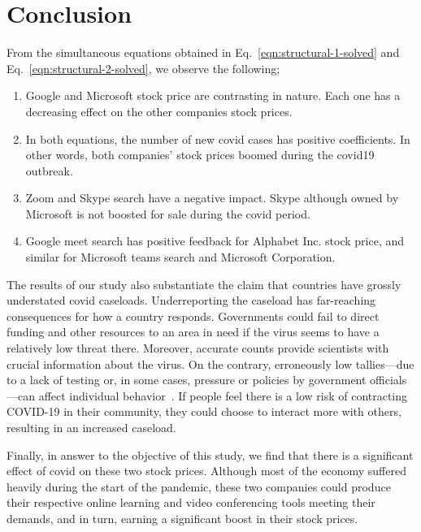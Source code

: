 \documentclass[11pt, a4paper]{article}
\begin{document}
\section{Conclusion}

From the simultaneous equations obtained in Eq.~\eqref{eqn:structural-1-solved} and Eq.~\eqref{eqn:structural-2-solved}, we observe the following;


\begin{enumerate}
    \item Google and Microsoft stock price are contrasting in nature. Each one has a decreasing effect on the other companies stock prices.
    \item In both equations, the number of new covid cases has positive coefficients. In other words, both companies' stock prices boomed during the covid19 outbreak. 
    \item Zoom and Skype search have a negative impact. Skype although owned by Microsoft is not boosted for sale during the covid period. 
    \item Google meet search has positive feedback for Alphabet Inc. stock price, and similar for Microsoft teams search and Microsoft Corporation.
\end{enumerate}

The results of our study also substantiate the claim that countries have grossly understated covid caseloads. Underreporting the caseload has far-reaching consequences for how a country responds. Governments could fail to direct funding and other resources to an area in need if the virus seems to have a relatively low threat there. Moreover, accurate counts provide scientists with crucial information about the virus. On the contrary, erroneously low tallies—due to a lack of testing or, in some cases, pressure or policies by government officials—can affect individual behavior~\cite{covid-underreporting}. If people feel there is a low risk of contracting COVID-19 in their community, they could choose to interact more with others, resulting in an increased caseload. 

Finally, in answer to the objective of this study, we find that there is a significant effect of covid on these two stock prices. Although most of the economy suffered heavily during the start of the pandemic, these two companies could produce their respective online learning and video conferencing tools meeting their demands, and in turn, earning a significant boost in their stock prices.





\nocite{*}
\end{document}
